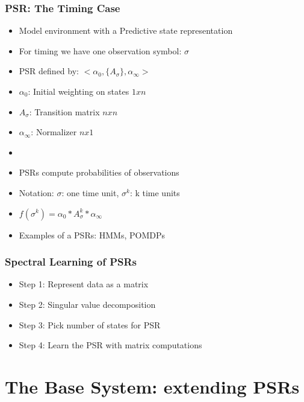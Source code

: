 \documentclass{beamer}
\begin{document}
\begin{frame}
\frametitle{PSR: The Timing Case}

\begin{itemize}
\item Model environment with a Predictive state representation
\item For timing we have one observation symbol: {$\sigma$}
\item PSR defined by: $<\alpha_0, \{A_\sigma\},\alpha_\infty>$
\item[] $\alpha_0$: Initial weighting on states $1xn$
\item[] $A_\sigma$: Transition matrix $nxn$
\item[] $\alpha_\infty$: Normalizer $nx1$
\item[]
\item PSRs compute probabilities of observations
\item[] Notation: $\sigma$: one time unit, $\sigma^k$: k time units
\item[] $f(\sigma^k) = \alpha_0*A_\sigma^k*\alpha_\infty$
\item Examples of a PSRs: HMMs, POMDPs
 
\end{itemize}

\end{frame}


\begin{frame}
\frametitle{Spectral Learning of PSRs}

\begin{itemize}
\item[] Step 1: Represent data as a matrix
\item[] Step 2: Singular value decomposition
\item[] Step 3: Pick number of states for PSR
\item[] Step 4: Learn the PSR with matrix computations
\end{itemize}

\end{frame}

\section{The Base System: extending PSRs}
\end{document}
